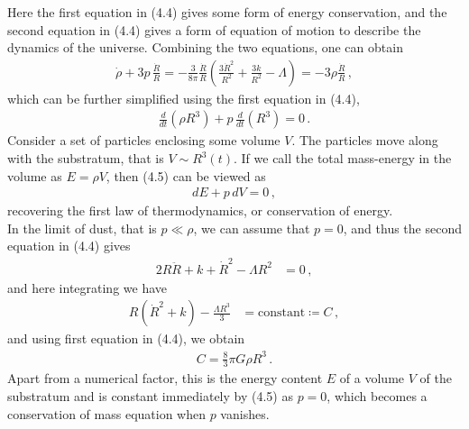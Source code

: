 \documentclass[11pt, onesided]{book}
\theoremstyle{break}
\theoremstyle{break}
\begin{document}
Here the first equation in (4.4) gives some form of energy conservation, and the second equation in (4.4) gives a form of equation of motion to describe the dynamics of the universe. Combining the two equations, one can obtain
\begin{align*}
\dot{\rho} + 3p \, \frac{\dot{R}}{R} = -\frac{3}{8\pi}\frac{\dot{R}}{R}\left(\frac{3\dot{R}^2}{R^2} + \frac{3k}{R^2}-\Lambda \right) = -3\rho \frac{\dot{R}}{R}\,,
\end{align*}
which can be further simplified using the first equation in (4.4),
\begin{align*}
\frac{d}{dt}(\rho R^3) + p \, \frac{d}{dt}(R^3) = 0\,.
\end{align*}
Consider a set of particles enclosing some volume $V$. The particles move along with the substratum, that is $V \sim R^3(t)$. If we call the total mass-energy in the volume as $E = \rho V$, then (4.5) can be viewed as
\begin{align}
dE  + p\, dV = 0\,,
\end{align}
recovering the first law of thermodynamics, or conservation of energy. \\

In the limit of dust, that is $p\ll \rho$, we can assume that $p = 0$, and thus the second equation in (4.4) gives
\begin{align*}
2R\ddot{R} + k + \dot{R}^2 - \Lambda R^2 &= 0\,,
\end{align*}
and here integrating we have
\begin{align}
R(\dot{R}^2 + k) - \frac{\Lambda R^3}{3} &= \text{constant} \coloneqq C\,,
\end{align}
and using first equation in (4.4), we obtain
\begin{align*}
C = \frac{8}{3} \pi G\rho  R^3\,.
\end{align*}
Apart from a numerical factor, this is the energy content $E$ of a volume $V$ of the substratum and is constant immediately by (4.5) as $p=0$, which becomes a conservation of mass equation when $p$ vanishes. \\
\end{document}
